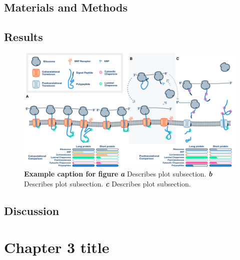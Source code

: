 \documentclass[12pt,oneside]{ucrthesis}
\begin{document}
\lipsum

\hypertarget{materials-and-methods-1}{%
\section{Materials and Methods}\label{materials-and-methods-1}}

\lipsum

\hypertarget{results-1}{%
\section{Results}\label{results-1}}

\lipsum
\begin{landscape}






\begin{figure}[h]

{\centering \includegraphics[width=1\linewidth]{images/expression_metrics} 

}

\caption[This is a short caption for list of figures]{\textbf{Example caption for figure}
\textbf{\emph{a}} Describes plot subsection.
\textbf{\emph{b}} Describes plot subsection.
\textbf{\emph{c}} Describes plot subsection.}\label{fig:metrics}
\end{figure}
\end{landscape}
\hypertarget{discussion-1}{%
\section{Discussion}\label{discussion-1}}

\lipsum

\hypertarget{chapter3-tag}{%
\chapter{Chapter 3 title}\label{chapter3-tag}}
\end{document}

